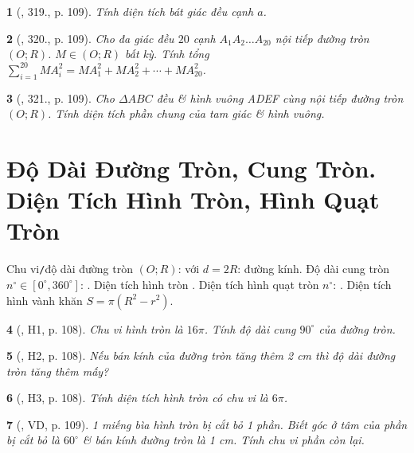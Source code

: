 \documentclass{article}
\newtheorem{baitoan}{}
\begin{document}
\begin{baitoan}[\cite{Binh_Toan_9_tap_2}, 319., p. 109]
	Tính diện tích bát giác đều cạnh $a$.
\end{baitoan}

\begin{baitoan}[\cite{Binh_Toan_9_tap_2}, 320., p. 109]
	Cho đa giác đều $20$ cạnh $A_1A_2\ldots A_{20}$ nội tiếp đường tròn $(O;R)$. $M\in(O;R)$ bất kỳ. Tính tổng $\sum_{i=1}^{20} MA_i^2 = MA_1^2 + MA_2^2 + \cdots + MA_{20}^2$.
\end{baitoan}

\begin{baitoan}[\cite{Binh_Toan_9_tap_2}, 321., p. 109]
	Cho $\Delta ABC$ đều \& hình vuông ADEF cùng nội tiếp đường tròn $(O;R)$. Tính diện tích phần chung của tam giác \& hình vuông.
\end{baitoan}


\section{Độ Dài Đường Tròn, Cung Tròn. Diện Tích Hình Tròn, Hình Quạt Tròn}
 Chu vi{\tt/}độ dài đường tròn $(O;R)$:  với $d = 2R$: đường kính. Độ dài cung tròn $n^\circ\in[0^\circ,360^\circ]$: .  Diện tích hình tròn . Diện tích hình quạt tròn $n^\circ$: .  Diện tích hình vành khăn $S = \pi(R^2 - r^2)$.

\begin{baitoan}[\cite{Binh_boi_duong_Toan_9_tap_2}, H1, p. 108]
	Chu vi hình tròn là $16\pi$. Tính độ dài cung $90^\circ$ của đường tròn.
\end{baitoan}

\begin{baitoan}[\cite{Binh_boi_duong_Toan_9_tap_2}, H2, p. 108]
	Nếu bán kính của đường tròn tăng thêm {\rm2 cm} thì độ dài đường tròn tăng thêm mấy?
\end{baitoan}

\begin{baitoan}[\cite{Binh_boi_duong_Toan_9_tap_2}, H3, p. 108]
	Tính diện tích hình tròn có chu vi là $6\pi$.
\end{baitoan}

\begin{baitoan}[\cite{Binh_boi_duong_Toan_9_tap_2}, VD, p. 109]
	1 miếng bìa hình tròn bị cắt bỏ 1 phần. Biết góc ở tâm của phần bị cắt bỏ là $60^\circ$ \& bán kính đường tròn là {\rm1 cm}. Tính chu vi phần còn lại.
\end{baitoan}
\end{document}
